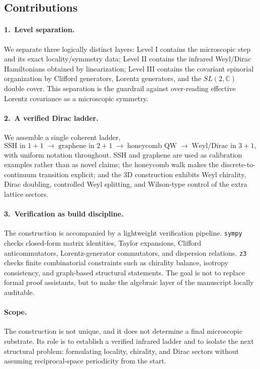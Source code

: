 \documentclass[a4paper,onecolumn,11pt]{quantumarticle}
\newcommand{\bbC}{\ensuremath{\mathbb{C}}}
\begin{document}
\subsection*{Contributions}

\paragraph{1.~Level separation.}
We separate three logically distinct layers: Level I contains the microscopic step and its exact locality/symmetry data; Level II contains the infrared Weyl/Dirac Hamiltonians obtained by linearization; Level III contains the covariant spinorial organization by Clifford generators, Lorentz generators, and the $SL(2,\bbC)$ double cover. This separation is the guardrail against over-reading effective Lorentz covariance as a microscopic symmetry.

\paragraph{2.~A verified Dirac ladder.}
We assemble a single coherent ladder,
\[
\text{SSH in }1{+}1 \;\longrightarrow\;
\text{graphene in }2{+}1 \;\longrightarrow\;
\text{honeycomb QW} \;\longrightarrow\;
\text{Weyl/Dirac in }3{+}1,
\]
with uniform notation throughout. SSH and graphene are used as calibration examples rather than as novel claims; the honeycomb walk makes the discrete-to-continuum transition explicit; and the 3D construction exhibits Weyl chirality, Dirac doubling, controlled Weyl splitting, and Wilson-type control of the extra lattice sectors.

\paragraph{3.~Verification as build discipline.}
The construction is accompanied by a lightweight verification pipeline. \texttt{sympy} checks closed-form matrix identities, Taylor expansions, Clifford anticommutators, Lorentz-generator commutators, and dispersion relations. \texttt{z3}~\cite{deMoura2008} checks finite combinatorial constraints such as chirality balance, isotropy consistency, and graph-based structural statements. The goal is not to replace formal proof assistants, but to make the algebraic layer of the manuscript locally auditable.

\paragraph{Scope.}
The construction is not unique, and it does not determine a final microscopic substrate. Its role is to establish a verified infrared ladder and to isolate the next structural problem: formulating locality, chirality, and Dirac sectors without assuming reciprocal-space periodicity from the start.
\end{document}
